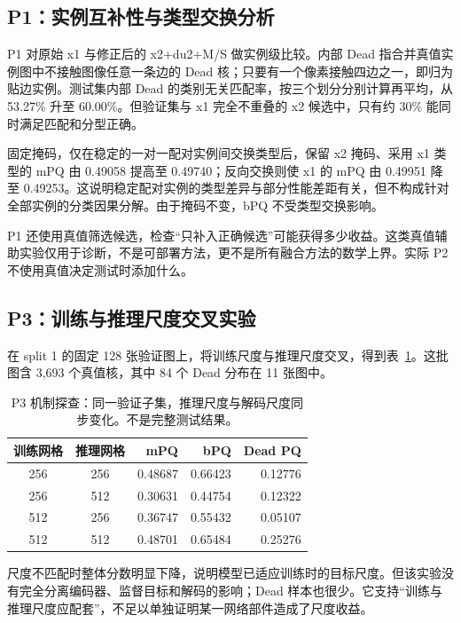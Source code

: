 \documentclass[11pt,a4paper,UTF8,fontset=fandol]{ctexart}
\begin{document}
\subsection{P1：实例互补性与类型交换分析}

P1 对原始 x1 与修正后的 x2+du2+M/S 做实例级比较。内部 Dead 指合并真值实例图中不接触图像任意一条边的 Dead 核；只要有一个像素接触四边之一，即归为贴边实例。测试集内部 Dead 的类别无关匹配率，按三个划分分别计算再平均，从 53.27\% 升至 60.00\%。但验证集与 x1 完全不重叠的 x2 候选中，只有约 30\% 能同时满足匹配和分型正确。

固定掩码，仅在稳定的一对一配对实例间交换类型后，保留 x2 掩码、采用 x1 类型的 mPQ 由 0.49058 提高至 0.49740；反向交换则使 x1 的 mPQ 由 0.49951 降至 0.49253。这说明稳定配对实例的类型差异与部分性能差距有关，但不构成针对全部实例的分类因果分解。由于掩码不变，bPQ 不受类型交换影响。

P1 还使用真值筛选候选，检查“只补入正确候选”可能获得多少收益。这类真值辅助实验仅用于诊断，不是可部署方法，更不是所有融合方法的数学上界。实际 P2 不使用真值决定测试时添加什么。

\subsection{P3：训练与推理尺度交叉实验}

在 split 1 的固定 128 张验证图上，将训练尺度与推理尺度交叉，得到表~\ref{tab:p3}。这批图含 3,693 个真值核，其中 84 个 Dead 分布在 11 张图中。

\begin{table}[H]
\centering\small
\caption{P3 机制探查：同一验证子集，推理尺度与解码尺度同步变化。不是完整测试结果。}
\label{tab:p3}
\begin{tabular}{ccrrr}\toprule
训练网格 & 推理网格 & mPQ & bPQ & Dead PQ\\\midrule
256 & 256 & 0.48687 & 0.66423 & 0.12776\\
256 & 512 & 0.30631 & 0.44754 & 0.12322\\
512 & 256 & 0.36747 & 0.55432 & 0.05107\\
512 & 512 & 0.48701 & 0.65484 & 0.25276\\\bottomrule
\end{tabular}
\end{table}

尺度不匹配时整体分数明显下降，说明模型已适应训练时的目标尺度。但该实验没有完全分离编码器、监督目标和解码的影响；Dead 样本也很少。它支持“训练与推理尺度应配套”，不足以单独证明某一网络部件造成了尺度收益。
\end{document}
